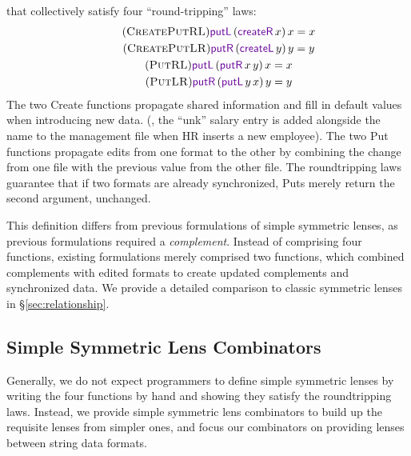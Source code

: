 \documentclass[acmsmall,screen,anonymous]{acmart}
\begin{document}
\noindent
that collectively satisfy four ``round-tripping'' laws: 
\begin{gather}
  \tag{\CreatePutRL}
  \PutLOf{(\CreateROf{x})}{x} = x\\
  \tag{\CreatePutLR}
  \PutROf{(\CreateLOf{y})}{y} = y\\
  \tag{\PutRL}
  \PutLOf{(\PutROf{x}{y})}{x} = x\\
  \tag{\PutLR}
  \PutROf{(\PutLOf{y}{x})}{y} = y
\end{gather}
\noindent
The two {\sc Create} functions propagate shared information and fill in default
values when introducing new data. (\EG, the ``unk'' salary entry is added
alongside the name to the management file when HR inserts a new employee). The
two {\sc Put} functions propagate edits from one format to the other by
combining the change from one file with the previous value from the other file.
The roundtripping laws guarantee that if two formats are already synchronized,
{\sc Put}s merely return the second argument, unchanged.

This definition differs from previous formulations of simple symmetric lenses,
as previous formulations required a \emph{complement}. Instead of comprising
four functions, existing formulations merely comprised two functions, which
combined complements with edited formats to create updated complements and
synchronized data. We provide a detailed comparison to classic symmetric lenses
in \S\ref{sec:relationship}.



\subsection{Simple Symmetric Lens Combinators}




Generally, we do not expect programmers to define simple symmetric lenses by
writing the four functions by hand and showing they satisfy the roundtripping
laws. Instead, we provide simple symmetric lens combinators to build up the
requisite lenses from simpler ones, and focus our combinators on providing
lenses between string data formats.
\end{document}
